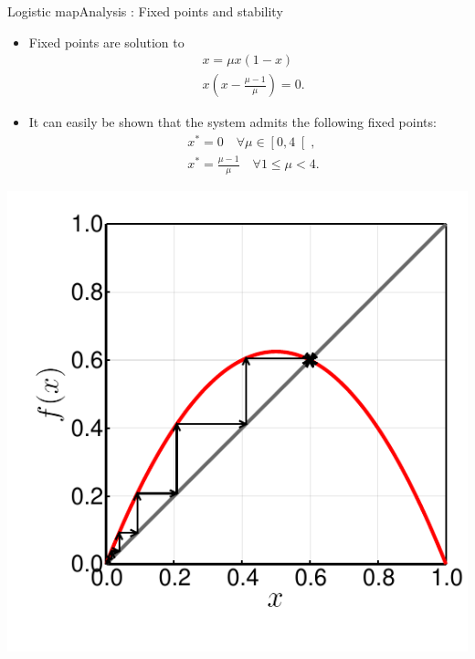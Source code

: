 \documentclass[usenames,dvipsnames,svgnames,10pt,aspectratio=169]{beamer}
\begin{document}
\begin{frame}[t, c]{Logistic map}{Analysis : Fixed points and stability}
	\begin{minipage}{.68\textwidth}
		\begin{itemize}
			\item Fixed points are solution to
			\[
				\begin{aligned}
					& x = \mu	 x \left( 1 - x \right) \\
					& x \left( x - \frac{\mu -1}{\mu} \right) = 0.
				\end{aligned}
			\]

			\item It can easily be shown that the system admits the following fixed points:
			\[
				\begin{aligned}
					& x^* = 0 \quad \forall \mu \in \left[ 0, 4 \right[, \\
					& x^* = \frac{\mu - 1}{\mu} \quad \forall 1 \leq \mu < 4.
				\end{aligned}
			\]
		\end{itemize}
	\end{minipage}%
	\hfill
	\begin{minipage}{.28\textwidth}
		\centering
		\includegraphics[width=\textwidth]{cobweb_logistic_map}
	\end{minipage}

	\vspace{1cm}
\end{frame}
\end{document}
